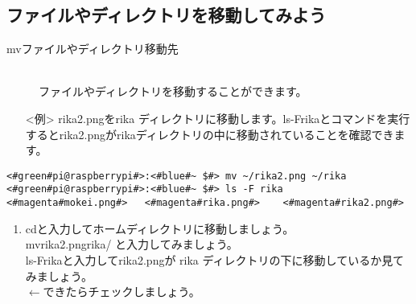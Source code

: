 \subsection{ファイルやディレクトリを移動してみよう}
\begin{description}
\item[mv\textvisiblespace ファイルやディレクトリ\textvisiblespace 移動先]\mbox{}\\
ファイルやディレクトリを移動することができます。
\end{description}
\begin{itemize}
\item[<例>]rika2.pngをrika ディレクトリに移動します。ls\textvisiblespace -F\textvisiblespace rikaとコマンドを実行するとrika2.pngがrikaディレクトリの中に移動されていることを確認できます。
\end{itemize}
\begin{lstlisting}[caption=mvの例, label=mv]
<#green#pi@raspberrypi#>:<#blue#~ $#> mv ~/rika2.png ~/rika
<#green#pi@raspberrypi#>:<#blue#~ $#> ls -F rika
<#magenta#mokei.png#>	<#magenta#rika.png#>	<#magenta#rika2.png#>
\end{lstlisting}

\begin{tcolorbox}[title=\useOmetoi]
\begin{enumerate}
\item cdと入力してホームディレクトリに移動しましょう。\\ 
mv\textvisiblespace rika2.png\textvisiblespace rika/ と入力してみましょう。\\
ls\textvisiblespace -F\textvisiblespace rikaと入力してrika2.pngが rika ディレクトリの下に移動しているか見てみましょう。\\
\fbox{\phantom{白}} $\leftarrow$できたらチェックしましょう。
\end{enumerate}
\end{tcolorbox}